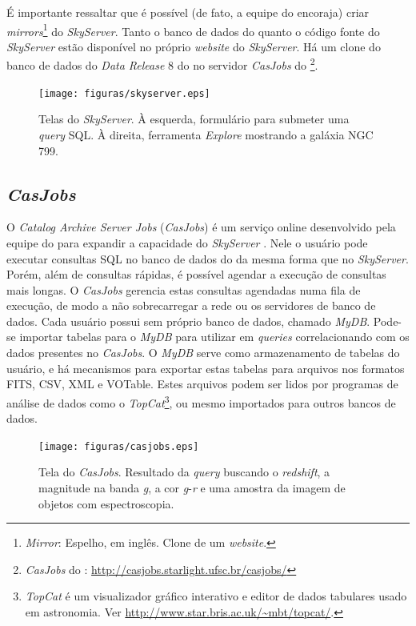 É importante ressaltar que é possível (de fato, a equipe do \SDSS encoraja)
criar {\em mirrors}\footnote{{\em Mirror}: Espelho, em inglês. Clone de um {\em
website}.} do {\em SkyServer}. Tanto o banco de dados do \SDSS quanto o código
fonte do {\em SkyServer} estão disponível no próprio {\em website} do {\em
SkyServer}. Há um clone do banco de dados do {\em Data Release} 8 do \SDSS no
servidor {\em CasJobs} do \starlight \footnote{{\em CasJobs} do \starlight:
\url{http://casjobs.starlight.ufsc.br/casjobs/}}.

\begin{figure}
	\texttt{[image: figuras/skyserver.eps]}
	\caption[Telas do {\em SkyServer}.]
	{Telas do {\em SkyServer}. À esquerda, formulário para submeter uma {\em
	query} SQL. À direita, ferramenta {\em Explore} mostrando a galáxia NGC 799.}
	\label{fig:TelaDoSkyServer}
\end{figure}

\subsection{{\em CasJobs}}

\label{sec:CrossMatch:SDSS:CasJobs}
O {\em Catalog Archive Server Jobs} ({\em CasJobs}) é um serviço online
desenvolvido pela equipe do \SDSS para expandir a capacidade do {\em SkyServer}
\citep{Li2008}. Nele o usuário pode executar consultas SQL no banco de dados do
\SDSS da mesma forma que no {\em SkyServer}. Porém, além de consultas rápidas, é
possível agendar a execução de consultas mais longas. O {\em CasJobs} gerencia
estas consultas agendadas numa fila de execução, de modo a não sobrecarregar a
rede ou os servidores de banco de dados. Cada usuário possui sem próprio banco
de dados, chamado {\em MyDB}. Pode-se importar tabelas para o {\em MyDB} para
utilizar em {\em queries} correlacionando com os dados presentes no {\em
CasJobs}. O {\em MyDB} serve como armazenamento de tabelas do usuário, e há
mecanismos para exportar estas tabelas para arquivos nos formatos FITS, CSV, XML
e VOTable. Estes arquivos podem ser lidos por programas de análise de dados como
o {\em TopCat}\footnote{{\em TopCat} é um visualizador gráfico interativo e
editor de dados tabulares usado em astronomia. Ver
\url{http://www.star.bris.ac.uk/~mbt/topcat/}.}, ou mesmo importados para outros
bancos de dados.

\begin{figure}
	\texttt{[image: figuras/casjobs.eps]}
	\caption[Tela do {\em CasJobs}.]
	{Tela do {\em CasJobs}. Resultado da {\em query} buscando o {\em redshift}, a
	magnitude na banda {\em g}, a cor {\em g}-{\em r} e uma amostra da imagem de
	objetos com espectroscopia.}
	\label{fig:CasJobs}
\end{figure}

